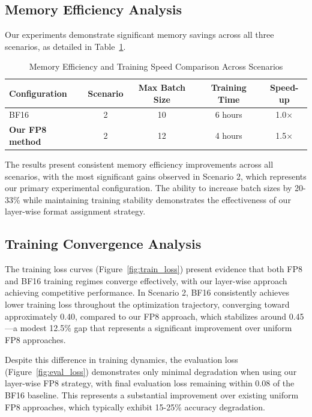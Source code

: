 \documentclass[conference]{IEEEtran}
\begin{document}
\subsection{Memory Efficiency Analysis}

Our experiments demonstrate significant memory savings across all three scenarios, as detailed in Table~\ref{tab:memory_results}.

\begin{table}[htbp]
\centering
\caption{Memory Efficiency and Training Speed Comparison Across Scenarios}
\begin{tabular}{@{}lcccc@{}}
\toprule
Configuration & Scenario & Max Batch Size & Training Time & Speed-up \\
\midrule
BF16 & 2 & 10 & 6 hours & 1.0$\times$ \\
\textbf{Our FP8 method} & 2 & 12 & 4 hours & 1.5$\times$ \\
\bottomrule
\end{tabular}
\label{tab:memory_results}
\end{table}

The results present consistent memory efficiency improvements across all scenarios, with the most significant gains observed in Scenario 2, which represents our primary experimental configuration. The ability to increase batch sizes by 20-33\% while maintaining training stability demonstrates the effectiveness of our layer-wise format assignment strategy.

\subsection{Training Convergence Analysis}

The training loss curves (Figure~\ref{fig:train_loss}) present evidence that both FP8 and BF16 training regimes converge effectively, with our layer-wise approach achieving competitive performance. In Scenario 2, BF16 consistently achieves lower training loss throughout the optimization trajectory, converging toward approximately 0.40, compared to our FP8 approach, which stabilizes around 0.45—a modest 12.5\% gap that represents a significant improvement over uniform FP8 approaches.

Despite this difference in training dynamics, the evaluation loss (Figure~\ref{fig:eval_loss}) demonstrates only minimal degradation when using our layer-wise FP8 strategy, with final evaluation loss remaining within 0.08 of the BF16 baseline. This represents a substantial improvement over existing uniform FP8 approaches, which typically exhibit 15-25\% accuracy degradation.
\end{document}
